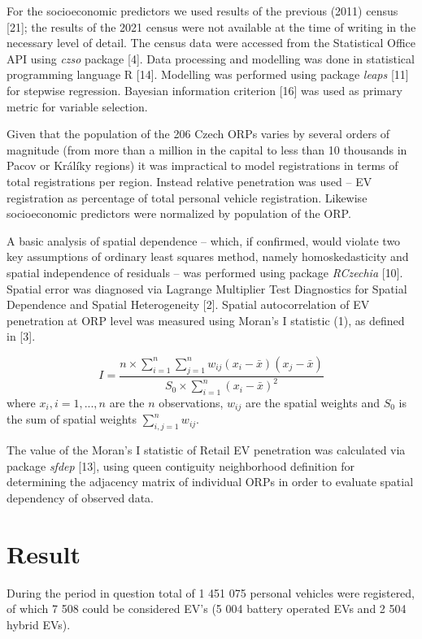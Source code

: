 \documentclass{mmeproc}
\begin{document}
For the socioeconomic predictors we used results of the previous (2011)
census {[}21{]}; the results of the 2021 census were not available at
the time of writing in the necessary level of detail. The census data
were accessed from the Statistical Office API using \emph{czso} package
{[}4{]}. Data processing and modelling was done in statistical
programming language R {[}14{]}. Modelling was performed using package
\emph{leaps} {[}11{]} for stepwise regression. Bayesian information
criterion {[}16{]} was used as primary metric for variable selection.

Given that the population of the 206 Czech ORPs varies by several orders
of magnitude (from more than a million in the capital to less than 10
thousands in Pacov or Králíky regions) it was impractical to model
registrations in terms of total registrations per region. Instead
relative penetration was used -- EV registration as percentage of total
personal vehicle registration. Likewise socioeconomic predictors were
normalized by population of the ORP.

A basic analysis of spatial dependence -- which, if confirmed, would
violate two key assumptions of ordinary least squares method, namely
homoskedasticity and spatial independence of residuals -- was performed
using package \emph{RCzechia} {[}10{]}. Spatial error was diagnosed via
Lagrange Multiplier Test Diagnostics for Spatial Dependence and Spatial
Heterogeneity {[}2{]}. Spatial autocorrelation of EV penetration at ORP
level was measured using Moran's I statistic (1), as defined in {[}3{]}.

\[
I = \frac{n \times \sum_{i=1}^n\sum_{j=1}^n w_{ij}(x_i - \bar{x})(x_j - \bar{x})}{S_0 \times \sum_{i=1}^n (x_i - \bar{x})^2} \tag{1}
\]
where \(x_i, i = 1, ..., n\) are the \(n\) observations, \(w_{ij}\)
are the spatial weights and \(S_0\) is the sum of spatial weights
\(\sum_{i, j=1}^n w_{ij}\).

The value of the Moran's I statistic of Retail EV penetration was
calculated via package \emph{sfdep} {[}13{]}, using queen contiguity
neighborhood definition for determining the adjacency matrix of
individual ORPs in order to evaluate spatial dependency of observed
data.

\hypertarget{result}{%
\section{Result}\label{result}}

During the period in question total of 1 451 075 personal vehicles were
registered, of which 7 508 could be considered EV's (5 004 battery
operated EVs and 2 504 hybrid EVs).
\end{document}
